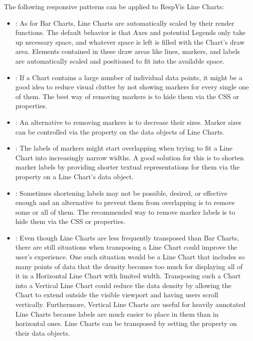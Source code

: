 The following responsive patterns can be applied to RespVis Line Charts:
\begin{itemize}
\item {}: As for Bar Charts, Line Charts are
  automatically scaled by their render functions.  The default
  behavior is that Axes and potential Legends only take up necessary
  space, and whatever space is left is filled with the Chart's draw
  area.  Elements contained in these draw areas like lines, markers,
  and labels are automatically scaled and positioned to fit into the
  available space.

\item {}: If a Chart contains a large number of
  individual data points, it might be a good idea to reduce visual
  clutter by not showing markers for every single one of them.  The
  best way of removing markers is to hide them via the CSS
   or  properties.

\item {}: An alternative to removing markers is
  to decrease their sizes.  Marker sizes can be controlled via the
   property on the data objects of Line Charts.

\item {}: The labels of markers might
  start overlapping when trying to fit a Line Chart into increasingly
  narrow widths.  A good solution for this is to shorten marker labels
  by providing shorter textual representations for them via the
   property on a Line Chart's data object.

\item {}: Sometimes shortening labels may
  not be possible, desired, or effective enough and an alternative to
  prevent them from overlapping is to remove some or all of them.  The
  recommended way to remove marker labels is to hide them via the CSS
   or  properties.

\item {}: Even though Line Charts are less
  frequently transposed than Bar Charts, there are still situations
  when transposing a Line Chart could improve the user's experience.
  One such situation would be a Line Chart that includes so many
  points of data that the density becomes too much for displaying all
  of it in a Horizontal Line Chart with limited width.  Transposing
  such a Chart into a Vertical Line Chart could reduce the data
  density by allowing the Chart to extend outside the visible viewport
  and having users scroll vertically.  Furthermore, Vertical Line
  Charts are useful for heavily annotated Line Charts because labels
  are much easier to place in them than in horizontal ones.  Line
  Charts can be transposed by setting the  property on
  their data objects.


\end{itemize}

